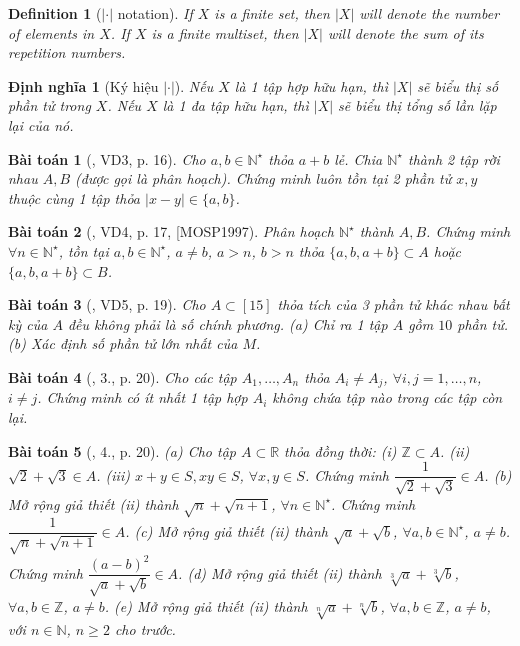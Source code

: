 \documentclass[oneside]{book}
\newtheorem{baitoan}{Bài toán}
\newtheorem{definition}{Definition}
\newtheorem{dinhnghia}{Định nghĩa}
\begin{document}
\begin{definition}[$|\cdot|$ notation]
	If $X$ is a finite set, then $|X|$ will denote the number of elements in $X$. If $X$ is a finite multiset, then $|X|$ will denote the sum of its repetition numbers.
\end{definition}

\begin{dinhnghia}[Ký hiệu $|\cdot|$]
	Nếu $X$ là 1 tập hợp hữu hạn, thì $|X|$ sẽ biểu thị số phần tử trong $X$. Nếu $X$ là 1 đa tập hữu hạn, thì $|X|$ sẽ biểu thị tổng số lần lặp lại của nó.
\end{dinhnghia}

\begin{baitoan}[\cite{Phuong_to_hop}, VD3, p. 16]
	Cho $a,b\in\mathbb{N}^\star$ thỏa $a + b$ lẻ. Chia $\mathbb{N}^\star$ thành 2 tập rời nhau $A,B$ (được gọi là {\rm phân hoạch}). Chứng minh luôn tồn tại 2 phần tử $x,y$ thuộc cùng 1 tập thỏa $|x - y|\in\{a,b\}$.
\end{baitoan}

\begin{baitoan}[\cite{Phuong_to_hop}, VD4, p. 17, [MOSP1997]
	Phân hoạch $\mathbb{N}^\star$ thành $A,B$. Chứng minh $\forall n\in\mathbb{N}^\star$, tồn tại $a,b\in\mathbb{N}^\star$, $a\ne b$, $a > n$, $b > n$ thỏa $\{a,b,a + b\}\subset A$ hoặc $\{a,b,a + b\}\subset B$.
\end{baitoan}

\begin{baitoan}[\cite{Phuong_to_hop}, VD5, p. 19]
	Cho $A\subset[15]$ thỏa tích của 3 phần tử khác nhau bất kỳ của $A$ đều không phải là số chính phương. (a) Chỉ ra 1 tập $A$ gồm $10$ phần tử. (b) Xác định số phần tử lớn nhất của $M$.
\end{baitoan}

\begin{baitoan}[\cite{Phuong_to_hop}, 3., p. 20]
	Cho các tập $A_1,\ldots,A_n$ thỏa $A_i\ne A_j$, $\forall i,j = 1,\ldots,n$, $i\ne j$. Chứng minh có ít nhất 1 tập hợp $A_i$ không chứa tập nào trong các tập còn lại.
\end{baitoan}

\begin{baitoan}[\cite{Phuong_to_hop}, 4., p. 20]
	(a) Cho tập $A\subset\mathbb{R}$ thỏa đồng thời: (i) $\mathbb{Z}\subset A$. (ii) $\sqrt{2} + \sqrt{3}\in A$. (iii) $x + y\in S,xy\in S$, $\forall x,y\in S$. Chứng minh $\dfrac{1}{\sqrt{2} + \sqrt{3}}\in A$. (b) Mở rộng giả thiết (ii) thành $\sqrt{n} + \sqrt{n + 1}$, $\forall n\in\mathbb{N}^\star$. Chứng minh $\dfrac{1}{\sqrt{n} + \sqrt{n + 1}}\in A$. (c) Mở rộng giả thiết (ii) thành $\sqrt{a} + \sqrt{b}$, $\forall a,b\in\mathbb{N}^\star$, $a\ne b$. Chứng minh $\dfrac{(a - b)^2}{\sqrt{a} + \sqrt{b}}\in A$. (d) Mở rộng giả thiết (ii) thành $\sqrt[3]{a} + \sqrt[3]{b}$, $\forall a,b\in\mathbb{Z}$, $a\ne b$. (e) Mở rộng giả thiết (ii) thành $\sqrt[n]{a} + \sqrt[n]{b}$, $\forall a,b\in\mathbb{Z}$, $a\ne b$, với $n\in\mathbb{N}$, $n\ge2$ cho trước.
\end{baitoan}
\end{document}
